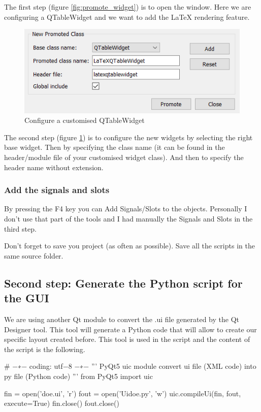 \documentclass[english, 12 pt, openany, oneside]{book}
\begin{document}
The first step (figure \ref{fig:promote_widget}) is to open the  window. Here we are configuring a QTableWidget and we want to add the LaTeX rendering feature.

\begin{figure}[!ht]
\centering
\includegraphics[width=0.6\linewidth]{config_promote}
\caption{Configure a customised QTableWidget\label{fig:config_promote}}
\end{figure}

The second step (figure \ref{fig:config_promote}) is to configure the new widgets by selecting the right base widget. Then by specifying the class name (it can be found in the header/module file of your customised widget class). And then to specify the header name without extension.

\subsubsection{Add the signals and slots}
By pressing the F4 key you can Add Signals/Slots to the objects. Personally I don't use that part of the tools and I had manually the Signals and Slots in the third step.

Don't forget to save you project (as often as possible). Save all the scripts in the same source folder.

\subsection{Second step: Generate the Python script for the GUI}
We are using another Qt module to convert the .ui file generated by the Qt Designer tool. This tool will generate a Python code that will allow to create our specific layout created before. This tool is used in the  script and the content of the script is the following.

\begin{pyverbatim}
# −∗− coding: utf−8 −∗−
''' PyQt5 uic module convert ui file (XML code) into py file (Python code) '''
from PyQt5 import uic

fin = open('doe.ui', 'r')
fout = open('Uidoe.py', 'w')
uic.compileUi(fin, fout, execute=True)
fin.close()
fout.close()
\end{pyverbatim}
\end{document}
